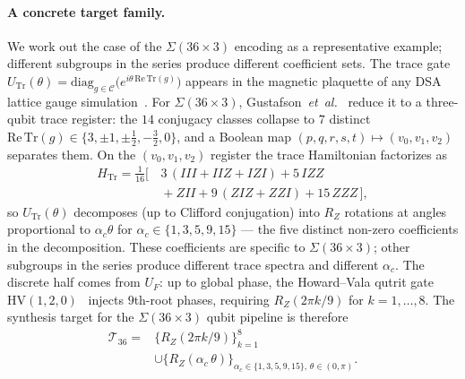 \documentclass[twocolumn,superscriptaddress,showpacs,nofootinbib,notitlepage,preprintnumbers,secnumarabic,amssymb, nobibnotes, aps, prd]{revtex4-2}
\newcommand{\HV}[3]{\mathrm{HV}(#1,#2,#3)} %
\newcommand{\Sigmathree}[1]{\Sigma(#1\!\times\!3)} %
\begin{document}
\paragraph*{A concrete target family.}
We work out the case of the $\Sigmathree{36}$ encoding as a representative example; different subgroups in the series produce different coefficient sets. The trace gate $U_\mathrm{Tr}(\theta) = \mathrm{diag}_{g \in \mathcal{C}}\bigl(e^{i \theta\,\mathrm{Re}\,\mathrm{Tr}(g)}\bigr)$ appears in the magnetic plaquette of any DSA lattice gauge simulation~\cite{Lamm:2019bik}. For $\Sigmathree{36}$, Gustafson~\emph{et~al.}~\cite{GustafsonJi:2024sig} reduce it to a three-qubit trace register: the $14$ conjugacy classes collapse to $7$ distinct $\mathrm{Re}\,\mathrm{Tr}(g)\in\{3,\pm 1,\pm\tfrac{1}{2},-\tfrac{3}{2},0\}$, and a Boolean map $(p,q,r,s,t)\mapsto(v_0,v_1,v_2)$ separates them. On the $(v_0,v_1,v_2)$ register the trace Hamiltonian factorizes as
\begin{equation}
\begin{aligned}
  H_\mathrm{Tr} = \tfrac{1}{16}\bigl[\,
    & 3\,(III{+}IIZ{+}IZI) + 5\,IZZ \\
    & {}+ ZII + 9\,(ZIZ{+}ZZI) + 15\,ZZZ\,\bigr],
\end{aligned}
\end{equation}
so $U_\mathrm{Tr}(\theta)$ decomposes (up to Clifford conjugation) into $R_Z$ rotations at angles proportional to $\alpha_c\theta$ for $\alpha_c \in \{1,3,5,9,15\}$ --- the five distinct non-zero coefficients in the decomposition. These coefficients are specific to $\Sigmathree{36}$; other subgroups in the series produce different trace spectra and different $\alpha_c$. The discrete half comes from $U_F$: up to global phase, the Howard--Vala qutrit gate $\HV{1}{2}{0}$~\cite{Howard:2012fva} injects $9$th-root phases, requiring $R_Z(2\pi k/9)$ for $k=1,\ldots,8$. The synthesis target for the $\Sigmathree{36}$ qubit pipeline is therefore
\begin{align}
  \mathcal{T}_{36} = {}& \bigl\{R_Z(2\pi k/9)\bigr\}_{k=1}^{8} \nonumber \\
    &\cup \bigl\{R_Z(\alpha_c\,\theta)\bigr\}_{\alpha_c \in \{1,3,5,9,15\},\,\theta\in(0,\pi)}.
  \label{eq:T36}
\end{align}
\end{document}
